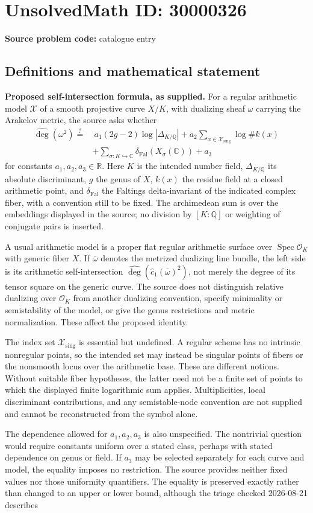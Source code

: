 \documentclass[11pt]{article}
\newcommand{\Q}{\mathbb{Q}}
\newcommand{\R}{\mathbb{R}}
\newcommand{\C}{\mathbb{C}}
\begin{document}
\section*{UnsolvedMath ID: 30000326}
\textbf{Source problem code:} catalogue entry
\subsection{Definitions and mathematical statement}
\textbf{Proposed self-intersection formula, as supplied.} For a regular arithmetic model \(\mathcal X\) of a smooth projective curve \(X/K\), with dualizing sheaf \(\omega\) carrying the Arakelov metric, the source asks whether\[\begin{aligned}\widehat{\deg}(\omega^2)\stackrel{?}{=}&\ a_1(2g-2)\log|\Delta_{K/\Q}|+a_2\sum_{x\in\mathcal X_{\mathrm{sing}}}\log\#k(x)\\&+\sum_{\sigma:K\hookrightarrow\C}\delta_{\mathrm{Fal}}(X_\sigma(\C))+a_3\end{aligned}\] for constants \(a_1,a_2,a_3\in\R\). Here \(K\) is the intended number field, \(\Delta_{K/\Q}\) its absolute discriminant, \(g\) the genus of \(X\), \(k(x)\) the residue field at a closed arithmetic point, and \(\delta_{\mathrm{Fal}}\) the Faltings delta-invariant of the indicated complex fiber, with a convention still to be fixed. The archimedean sum is over the embeddings displayed in the source; no division by \([K:\Q]\) or weighting of conjugate pairs is inserted.\par A usual arithmetic model is a proper flat regular arithmetic surface over \(\operatorname{Spec}\mathcal O_K\) with generic fiber \(X\). If \(\bar\omega\) denotes the metrized dualizing line bundle, the left side is its arithmetic self-intersection \(\widehat{\deg}(\widehat c_1(\bar\omega)^2)\), not merely the degree of its tensor square on the generic curve. The source does not distinguish relative dualizing over \(\mathcal O_K\) from another dualizing convention, specify minimality or semistability of the model, or give the genus restrictions and metric normalization. These affect the proposed identity.\par The index set \(\mathcal X_{\mathrm{sing}}\) is essential but undefined. A regular scheme has no intrinsic nonregular points, so the intended set may instead be singular points of fibers or the nonsmooth locus over the arithmetic base. These are different notions. Without suitable fiber hypotheses, the latter need not be a finite set of points to which the displayed finite logarithmic sum applies. Multiplicities, local discriminant contributions, and any semistable-node convention are not supplied and cannot be reconstructed from the symbol alone.\par The dependence allowed for \(a_1,a_2,a_3\) is also unspecified. The nontrivial question would require constants uniform over a stated class, perhaps with stated dependence on genus or field. If \(a_3\) may be selected separately for each curve and model, the equality imposes no restriction. The source provides neither fixed values nor those uniformity quantifiers. The equality is preserved exactly rather than changed to an upper or lower bound, although the triage checked 2026-08-21 describes 
\end{document}
